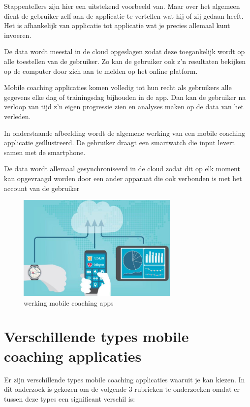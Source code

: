 Stappentellers zijn hier een uitstekend voorbeeld van. Maar over het algemeen dient de gebruiker zelf aan de applicatie te vertellen wat hij of zij gedaan heeft. Het is afhankelijk van applicatie tot applicatie wat je precies allemaal kunt invoeren. 

De data wordt meestal in de cloud opgeslagen zodat deze toegankelijk wordt op alle toestellen van de gebruiker. Zo kan de gebruiker ook z’n resultaten bekijken op de computer door zich aan te melden op het online platform.

Mobile coaching applicaties komen volledig tot hun recht als gebruikers alle gegevens elke dag of trainingsdag bijhouden in de app. Dan kan de gebruiker na verloop van tijd z’n eigen progressie zien en analyses maken op de data van het verleden.

In onderstaande afbeelding wordt de algemene werking van een mobile coaching applicatie geïllustreerd. De gebruiker draagt een smartwatch die input levert samen met de smartphone. 

De data wordt allemaal gesynchroniseerd in de cloud zodat dit op elk moment kan opgevraagd worden door een ander apparaat die ook verbonden is met het account van de gebruiker

\begin{figure}[h!]
\centering
\includegraphics[width=0.7\textwidth]{img/cloud-synch.JPG}
\caption{werking mobile coaching apps \autocite{elements.evato.com}}
\end{figure}

\newpage
\section{Verschillende types mobile coaching applicaties}
\label{sec:types}

Er zijn verschillende types mobile coaching applicaties waaruit je kan kiezen. In dit onderzoek is gekozen om de volgende 3 rubrieken te onderzoeken omdat er tussen deze types een significant verschil is:

